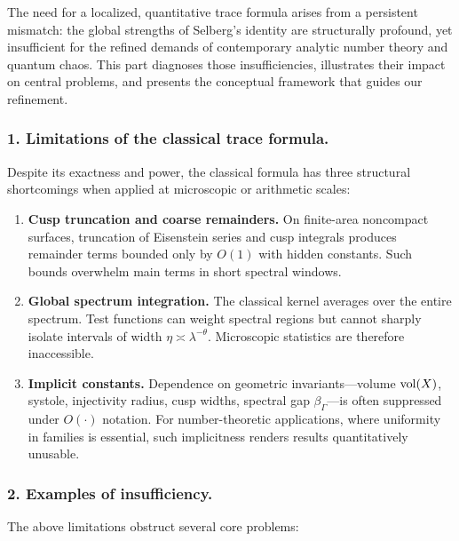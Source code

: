 The need for a localized, quantitative trace formula arises from a persistent
mismatch: the global strengths of Selberg’s identity are structurally profound,
yet insufficient for the refined demands of contemporary analytic number theory
and quantum chaos. This part diagnoses those insufficiencies, illustrates their
impact on central problems, and presents the conceptual framework that guides
our refinement.

\subsubsection*{1. Limitations of the classical trace formula.}
Despite its exactness and power, the classical formula has three structural
shortcomings when applied at microscopic or arithmetic scales:

\begin{enumerate}[label=\arabic*.]
  \item \textbf{Cusp truncation and coarse remainders.}
        On finite-area noncompact surfaces, truncation of Eisenstein series and cusp integrals
        produces remainder terms bounded only by $O(1)$ with hidden constants.
        Such bounds overwhelm main terms in short spectral windows.

  \item \textbf{Global spectrum integration.}
        The classical kernel averages over the entire spectrum. Test functions can weight
        spectral regions but cannot sharply isolate intervals of width
        $\eta\asymp\lambda^{-\theta}$.
        Microscopic statistics are therefore inaccessible.

  \item \textbf{Implicit constants.}
        Dependence on geometric invariants—volume $\operatorname{vol}(X)$, systole, injectivity radius,
        cusp widths, spectral gap $\beta_\Gamma$—is often suppressed under $O(\cdot)$ notation.
        For number-theoretic applications, where uniformity in families is essential,
        such implicitness renders results quantitatively unusable.
\end{enumerate}

\subsubsection*{2. Examples of insufficiency.}
The above limitations obstruct several core problems:

